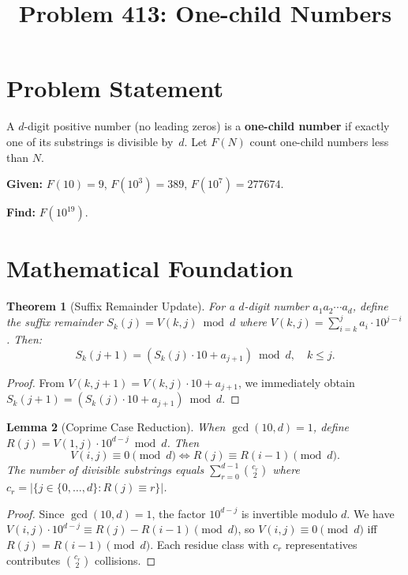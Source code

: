 \documentclass[11pt]{article}
\title{Problem 413: One-child Numbers}
\author{}
\date{}
\newtheorem{theorem}{Theorem}
\newtheorem{lemma}[theorem]{Lemma}
\begin{document}
\maketitle

\section{Problem Statement}

A $d$-digit positive number (no leading zeros) is a \textbf{one-child number} if exactly one of its substrings is divisible by~$d$. Let $F(N)$ count one-child numbers less than $N$.

\textbf{Given:} $F(10) = 9$, $F(10^3) = 389$, $F(10^7) = 277674$.

\textbf{Find:} $F(10^{19})$.

\section{Mathematical Foundation}

\begin{theorem}[Suffix Remainder Update]
For a $d$-digit number $a_1 a_2 \cdots a_d$, define the suffix remainder $S_k(j) = V(k,j) \bmod d$ where $V(k,j) = \sum_{i=k}^{j} a_i \cdot 10^{j-i}$. Then:
\[
S_k(j+1) = (S_k(j) \cdot 10 + a_{j+1}) \bmod d, \quad k \le j.
\]
\end{theorem}

\begin{proof}
From $V(k,j+1) = V(k,j) \cdot 10 + a_{j+1}$, we immediately obtain $S_k(j+1) = (S_k(j) \cdot 10 + a_{j+1}) \bmod d$.
\end{proof}

\begin{lemma}[Coprime Case Reduction]
\label{lem:coprime}
When $\gcd(10, d) = 1$, define $R(j) = V(1,j) \cdot 10^{d-j} \bmod d$. Then
\[
V(i,j) \equiv 0 \pmod{d} \iff R(j) \equiv R(i-1) \pmod{d}.
\]
The number of divisible substrings equals $\sum_{r=0}^{d-1} \binom{c_r}{2}$ where $c_r = |\{j \in \{0,\ldots,d\} : R(j) \equiv r\}|$.
\end{lemma}

\begin{proof}
Since $\gcd(10,d)=1$, the factor $10^{d-j}$ is invertible modulo $d$. We have $V(i,j) \cdot 10^{d-j} \equiv R(j) - R(i-1) \pmod{d}$, so $V(i,j) \equiv 0 \pmod{d}$ iff $R(j) = R(i-1) \pmod{d}$. Each residue class with $c_r$ representatives contributes $\binom{c_r}{2}$ collisions.
\end{proof}
\end{document}
